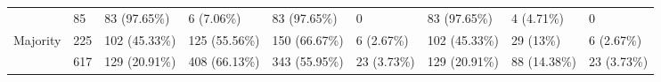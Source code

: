 \begin{table}[htbp]
{\begin{tabular}{lllllllll}
\rowcolor[HTML]{EFEFEF} 
\multicolumn{1}{|l|}{\cellcolor[HTML]{EFEFEF}Five} & \multicolumn{1}{l|}{\cellcolor[HTML]{EFEFEF}85} & \multicolumn{1}{l|}{\cellcolor[HTML]{EFEFEF}83 (97.65\%)} & \multicolumn{1}{l|}{\cellcolor[HTML]{EFEFEF}6 (7.06\%)} & \multicolumn{1}{l|}{\cellcolor[HTML]{EFEFEF}83 (97.65\%)} & \multicolumn{1}{l|}{\cellcolor[HTML]{EFEFEF}0} & \multicolumn{1}{l|}{\cellcolor[HTML]{EFEFEF}83 (97.65\%)} & \multicolumn{1}{l|}{\cellcolor[HTML]{EFEFEF}4 (4.71\%)} & \multicolumn{1}{l|}{\cellcolor[HTML]{EFEFEF}0} \\ \cline{5-5} \cline{7-7} \cline{9-9} 
\multicolumn{1}{|l|}{Majority} & \multicolumn{1}{l|}{225} & \multicolumn{1}{l|}{102 (45.33\%)} & \multicolumn{1}{l|}{125 (55.56\%)} & \multicolumn{1}{l|}{150 (66.67\%)} & \multicolumn{1}{l|}{6 (2.67\%)} & \multicolumn{1}{l|}{102 (45.33\%)} & \multicolumn{1}{l|}{29 (13\%)} & \multicolumn{1}{l|}{6 (2.67\%)} \\ \cline{5-5} \cline{7-7} \cline{9-9} 
\rowcolor[HTML]{EFEFEF} 
\multicolumn{1}{|l|}{\cellcolor[HTML]{EFEFEF}Total} & \multicolumn{1}{l|}{\cellcolor[HTML]{EFEFEF}617} & \multicolumn{1}{l|}{\cellcolor[HTML]{EFEFEF}129 (20.91\%)} & \multicolumn{1}{l|}{\cellcolor[HTML]{EFEFEF}408 (66.13\%)} & \multicolumn{1}{l|}{\cellcolor[HTML]{EFEFEF}343 (55.95\%)} & \multicolumn{1}{l|}{\cellcolor[HTML]{EFEFEF}23 (3.73\%)} & \multicolumn{1}{l|}{\cellcolor[HTML]{EFEFEF}129 (20.91\%)} & \multicolumn{1}{l|}{\cellcolor[HTML]{EFEFEF}88 (14.38\%)} & \multicolumn{1}{l|}{\cellcolor[HTML]{EFEFEF}23 (3.73\%)} \\ \cline{3-3} \cline{5-5} \cline{7-7} \cline{9-9} 
\end{tabular}}
\end{table}